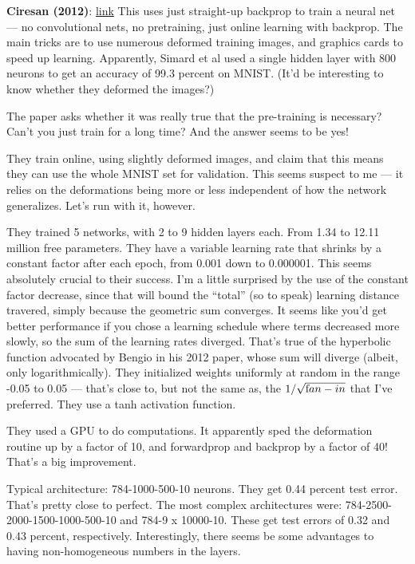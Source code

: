 \documentclass[12pt]{article}
\newcommand{\link}[2]{\href{#1}{#2}}
\begin{document}
\textbf{Ciresan (2012)}: \link{http://arxiv.org/abs/1003.0358}{link}
This uses just straight-up backprop to train a neural net --- no
convolutional nets, no pretraining, just online learning with
backprop.  The main tricks are to use numerous deformed training
images, and graphics cards to speed up learning.  Apparently, Simard
et al used a single hidden layer with 800 neurons to get an accuracy
of 99.3 percent on MNIST.  (It'd be interesting to know whether they
deformed the images?)

The paper asks whether it was really true that the pre-training is
necessary?  Can't you just train for a long time?  And the answer
seems to be yes!

They train online, using slightly deformed images, and claim that this
means they can use the whole MNIST set for validation.  This seems
suspect to me --- it relies on the deformations being more or less
independent of how the network generalizes.  Let's run with it,
however.

They trained 5 networks, with 2 to 9 hidden layers each.  From 1.34 to
12.11 million free parameters.  They have a variable learning rate
that shrinks by a constant factor after each epoch, from 0.001 down to
0.000001.  This seems absolutely crucial to their success. I'm a
little surprised by the use of the constant factor decrease, since
that will bound the ``total'' (so to speak) learning distance
travered, simply because the geometric sum converges.  It seems like
you'd get better performance if you chose a learning schedule where
terms decreased more slowly, so the sum of the learning rates
diverged.  That's true of the hyperbolic function advocated by Bengio
in his 2012 paper, whose sum will diverge (albeit, only
logarithmically).  They initialized weights uniformly at random in the
range -0.05 to 0.05 --- that's close to, but not the same as, the
$1/\sqrt{\mbox fan-in}$ that I've preferred.  They use a tanh
activation function.

They used a GPU to do computations.  It apparently sped the
deformation routine up by a factor of 10, and forwardprop and backprop
by a factor of 40!  That's a big improvement.

Typical architecture: 784-1000-500-10 neurons.  They get 0.44 percent
test error.  That's pretty close to perfect.  The most complex
architectures were: 784-2500-2000-1500-1000-500-10 and 784-9 x
10000-10.  These get test errors of 0.32 and 0.43 percent,
respectively.  Interestingly, there seems be some advantages to having
non-homogeneous numbers in the layers.
\end{document}
